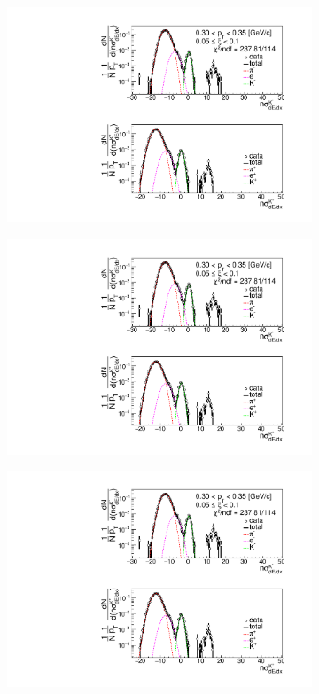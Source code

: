 \begin{figure}[h!]
	\centering
	\begin{subfigure}{.33\textwidth}
		\includegraphics[width=\linewidth, page=1]{chapters/chrgSTAR/img/dEdx/fit2019_thirdStep_1_1.pdf}
	\end{subfigure}
	\begin{subfigure}{.33\textwidth}
		\includegraphics[width=\linewidth, page=2]{chapters/chrgSTAR/img/dEdx/fit2019_thirdStep_1_1.pdf}
	\end{subfigure}
	\begin{subfigure}{.3\textwidth}
		\includegraphics[width=\linewidth, page=3]{chapters/chrgSTAR/img/dEdx/fit2019_thirdStep_1_1.pdf}

\end{subfigure}
\end{figure}
